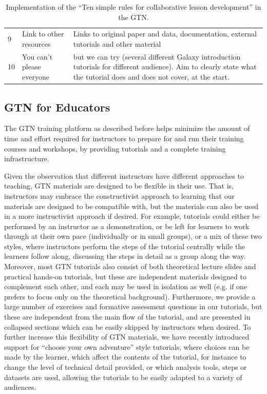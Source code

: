 \begin{table}[h!t]
\begin{tabular}{|l|p{}|p{}|}
		9  & {\raggedright Link to other resources}                          & Links to original paper and data, documentation, external tutorials and other material \\
		10 & {\raggedright You can't please everyone}                        & but we can try (several different Galaxy introduction tutorials for different audience). Aim to clearly state what the tutorial does and does not cover, at the start.  \\
		\hline
	\end{tabular}
  \caption{Implementation of the ``Ten simple rules for collaborative lesson development'' \cite{Devenyi_2018} in the GTN.}\label{S1_Table}
\end{table}



\subsection*{GTN for Educators}
The GTN training platform as described before helps minimize the amount of time and effort required for instructors to prepare for and run their training courses and workshops, by providing tutorials and a complete training infrastructure.

Given the observation that different instructors have different approaches to teaching, GTN materials are designed to be flexible in their use. That is, instructors may embrace the constructivist approach to learning that our materials are designed to be compatible with, but the materials can also be used in a more instructivist approach if desired. For example, tutorials could either be performed by an instructor as a demonstration, or be left for learners to work through at their own pace (individually or in small groups), or a mix of these two styles, where instructors perform the steps of the tutorial centrally while the learners follow along, discussing the steps in detail as a group along the way. Moreover, most GTN tutorials also consist of both theoretical lecture slides and practical hands-on tutorials, but these are independent materials designed to complement each other, and each may be used in isolation as well (e.g. if one prefers to focus only on the theoretical background). Furthermore, we provide a large number of exercises and formative assessment questions in our tutorials, but these are independent from the main flow of the tutorial, and are presented in collapsed sections which can be easily skipped by instructors when desired. To further increase this flexibility of GTN materials, we have recently introduced support for ``choose your own adventure'' style tutorials, where choices can be made by the learner, which affect the contents of the tutorial, for instance to change the level of technical detail provided, or which analysis tools, steps or datasets are used, allowing the tutorials to be easily adapted to a variety of audiences. 


